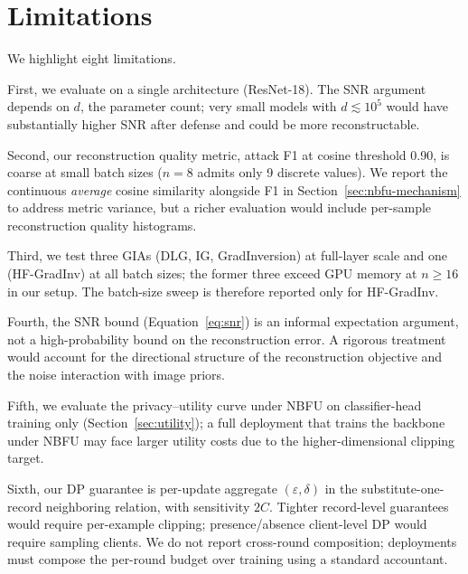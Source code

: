 \documentclass[11pt]{article}
\begin{document}
\section*{Limitations}

We highlight eight limitations.

First, we evaluate on a single architecture (ResNet-18). The SNR argument depends on $d$, the parameter count; very small models with $d \lesssim 10^5$ would have substantially higher SNR after defense and could be more reconstructable.

Second, our reconstruction quality metric, attack F1 at cosine threshold 0.90, is coarse at small batch sizes ($n{=}8$ admits only 9 discrete values). We report the continuous \emph{average} cosine similarity alongside F1 in Section~\ref{sec:nbfu-mechanism} to address metric variance, but a richer evaluation would include per-sample reconstruction quality histograms.

Third, we test three GIAs (DLG, IG, GradInversion) at full-layer scale and one (HF-GradInv) at all batch sizes; the former three exceed GPU memory at $n \ge 16$ in our setup. The batch-size sweep is therefore reported only for HF-GradInv.

Fourth, the SNR bound (Equation~\ref{eq:snr}) is an informal expectation argument, not a high-probability bound on the reconstruction error. A rigorous treatment would account for the directional structure of the reconstruction objective and the noise interaction with image priors.

Fifth, we evaluate the privacy--utility curve under NBFU on classifier-head training only (Section~\ref{sec:utility}); a full deployment that trains the backbone under NBFU may face larger utility costs due to the higher-dimensional clipping target.

Sixth, our DP guarantee is per-update aggregate $(\varepsilon,\delta)$ in the substitute-one-record neighboring relation, with sensitivity $2C$. Tighter record-level guarantees would require per-example clipping; presence/absence client-level DP would require sampling clients. We do not report cross-round composition; deployments must compose the per-round budget over training using a standard accountant.
\end{document}
